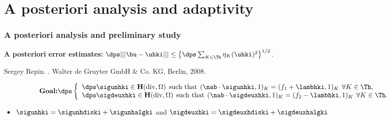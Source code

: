 \documentclass[10 pt]{beamer}
\renewcommand{\div}{\mathrm{div}}
\begin{document}
\section{A posteriori analysis and adaptivity}
\begin{frame}

\frametitle{A posteriori analysis and preliminary study}
\alert{\textbf{A posteriori error estimates:}}
$\dps |||\bu-\uhki||| \leq \left\{\dps \sum_{\substack{K \in\Th}} \eta_K(\uhki)^2\right\}^{1/2}$.\\

\scriptsize{
\begin{thebibliography}{10}
Sergey Repin.
.
\newblock Walter de Gruyter GmbH \& Co. KG, Berlin, 2008.
\end{thebibliography}
}
\vspace{-0.3 cm}
\normalsize
\begin{equation*}
\mbox{\textbf{Goal:}}\dps
\left\lbrace\begin{array}{llccc}
\dps \sigunhki \in \textbf H(\div,\Omega) \hspace{0.15 cm} \mbox{such that} \hspace{0.15 cm} (\nab \cdot \sigunhki,1)_K=(f_1+\lambhki,1)_K \hspace{0.15 cm} \forall K \in \Th, \\
\dps\sigdeuxhki \in \textbf H(\div,\Omega) \hspace{0.15 cm} \mbox{such that} \hspace{0.15 cm} (\nab \cdot \sigdeuxhki,1)_K=(f_2-\lambhki,1)_K \hspace{0.15 cm} \forall K \in \Th .
\end{array}
\right.
\end{equation*}
\normalsize
\begin{itemize}
\item 
$\sigunhki = \sigunhdiski + \sigunhalgki$ and $\sigdeuxhki = \sigdeuxhdiski + \sigdeuxhalgki$
\end{itemize}


\end{frame}
\end{document}
